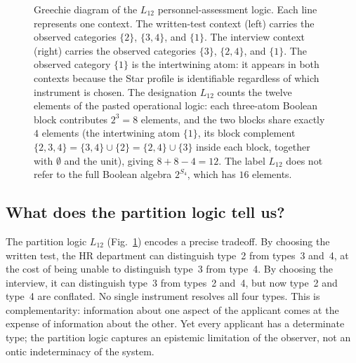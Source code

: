 \documentclass{article}
\begin{document}
\begin{figure}[t]
\centering
{}
\caption{Greechie diagram of the $L_{12}$ personnel-assessment
logic. Each line represents one context. The written-test context
(left) carries the observed categories $\{2\}$, $\{3,4\}$, and
$\{1\}$. The interview context (right) carries the observed
categories $\{3\}$, $\{2,4\}$, and $\{1\}$. The observed category
$\{1\}$ is the intertwining atom: it appears in both contexts
because the Star profile is identifiable regardless of which
instrument is chosen. The designation $L_{12}$ counts the
twelve elements of the pasted operational logic: each three-atom
Boolean block contributes $2^3=8$ elements, and the two blocks
share exactly $4$ elements (the intertwining atom $\{1\}$, its
block complement $\{2,3,4\}=\{3,4\}\cup\{2\}=\{2,4\}\cup\{3\}$
inside each block, together with $\emptyset$ and the unit), giving
$8+8-4=12$. The label $L_{12}$ does not refer to the full Boolean
algebra $2^{S_4}$, which has $16$ elements.}
\label{fig:L12}
\end{figure}

\subsection{What does the partition logic tell us?}

The partition logic $L_{12}$ (Fig.~\ref{fig:L12}) encodes a precise
tradeoff. By choosing the written test, the HR department can
distinguish type~2 from types~3 and~4, at the cost of being unable
to distinguish type~3 from type~4. By choosing the interview, it can
distinguish type~3 from types~2 and~4, but now type~2 and type~4 are
conflated. No single instrument resolves all four types. This is
complementarity: information about one aspect of the applicant comes
at the expense of information about the other. Yet every applicant
has a determinate type; the partition logic captures an epistemic
limitation of the observer, not an ontic indeterminacy of the system.
\end{document}
